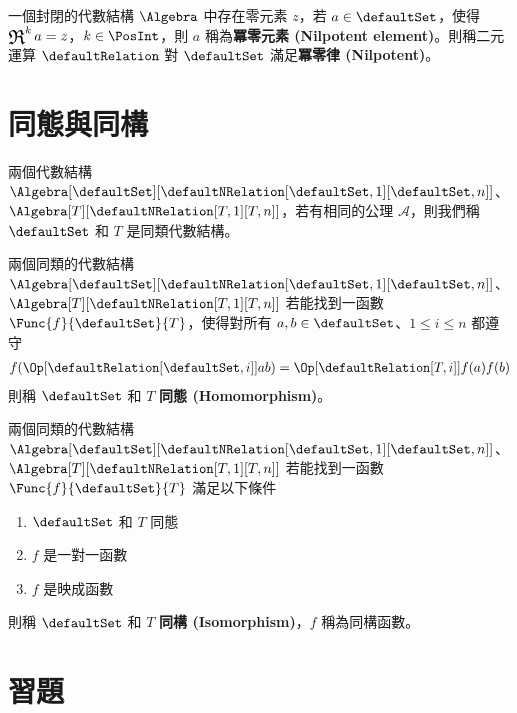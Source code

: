 \documentclass[12pt,a4paper,oneside]{report}
\begin{document}
\begin{CJK}{UTF8}{bkai}
\begin{mydef}[冪零元素與冪零律]
\label{def:algebra:nilpotent}
一個封閉的代數結構 $\Algebra$ 中存在零元素 $z$，若 $a\in{\defaultSet}$，使得 $\opR^{k}{a}=z$，$k\in{\PosInt}$，則 $a$ 稱為\textbf{冪零元素 (Nilpotent element)}。則稱二元運算 $\defaultRelation$ 對 $\defaultSet$ 滿足\textbf{冪零律 (Nilpotent)}。
\end{mydef}

\section{同態與同構}

\begin{mydef}[代數結構分類]
兩個代數結構 $\Algebra[\defaultSet][{\defaultNRelation[\defaultSet,1][\defaultSet,n]}]$、$\Algebra[T][{\defaultNRelation[T,1][T,n]}]$，若有相同的公理 $\mathcal{A}$，則我們稱 $\defaultSet$ 和 $T$ 是同類代數結構。
\end{mydef}

\begin{mydef}[同態]
\label{def:algebra:homomorphism}
兩個同類的代數結構 $\Algebra[\defaultSet][{\defaultNRelation[\defaultSet,1][\defaultSet,n]}]$、$\Algebra[T][{\defaultNRelation[T,1][T,n]}]$ 若能找到一函數 $\Func{f}{\defaultSet}{T}$，使得對所有 $a,b\in{\defaultSet}$、$1\leq{i}\leq{n}$ 都遵守
\begin{align*}
{f(\Op[{\defaultRelation[\defaultSet,i]}]{a}{b})}=\Op[{\defaultRelation[T,i]}]{f(a)}{f(b)}
\end{align*}
則稱 $\defaultSet$ 和 $T$ \textbf{同態 (Homomorphism)}。
\end{mydef}

\begin{mydef}[同構]
\label{def:algebra:isomorphism}
兩個同類的代數結構 $\Algebra[\defaultSet][{\defaultNRelation[\defaultSet,1][\defaultSet,n]}]$、$\Algebra[T][{\defaultNRelation[T,1][T,n]}]$ 若能找到一函數 $\Func{f}{\defaultSet}{T}$ 滿足以下條件
\begin{enumerate}
\item $\defaultSet$ 和 $T$ 同態
\item $f$ 是一對一函數
\item $f$ 是映成函數
\end{enumerate}
則稱 $\defaultSet$ 和 $T$ \textbf{同構 (Isomorphism)}，$f$ 稱為同構函數。
\end{mydef}

\section*{習題}


\end{CJK}
\end{document}
